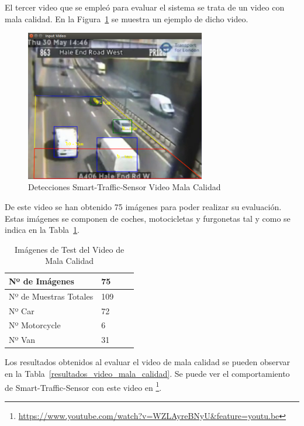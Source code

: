 El tercer video que se empleó para evaluar el sistema se trata de un video con mala calidad. En la Figura~\ref{fig.video_mala_calidad} se muestra un ejemplo de dicho video.


\begin{figure}
\begin{center}
	\includegraphics[width=0.7\textwidth]{figures/Experimentos/sts_mala_calidad.png}
   \caption{Detecciones Smart-Traffic-Sensor Video Mala Calidad}
	\label{fig.video_mala_calidad}
\end{center}
\end{figure}

De este video se han obtenido 75 imágenes para poder realizar su evaluación. Estas imágenes se componen de coches, motocicletas y furgonetas tal y como se indica en la Tabla~\ref{tabla_video_mala_calidad}. 

\begin{table}[htbp]
\begin{center}
\begin{tabular}{|l|l|l|l|}
\hline
Nº de Imágenes  & 75 \\
\hline \hline
Nº de Muestras Totales & 109\\ \hline
Nº Car & 72 \\ \hline
Nº Motorcycle & 6 \\ \hline
Nº Van & 31 \\ \hline
\end{tabular}
\caption{Imágenes de Test del Video de Mala Calidad}
\label{tabla_video_mala_calidad}
\end{center}
\end{table}

Los resultados obtenidos al evaluar el video de mala calidad se pueden observar en la Tabla~\ref{resultados_video_mala_calidad}. Se puede ver el comportamiento de Smart-Traffic-Sensor con este video en \footnote{\url{https://www.youtube.com/watch?v=WZLAyreBNyU&feature=youtu.be}}.

